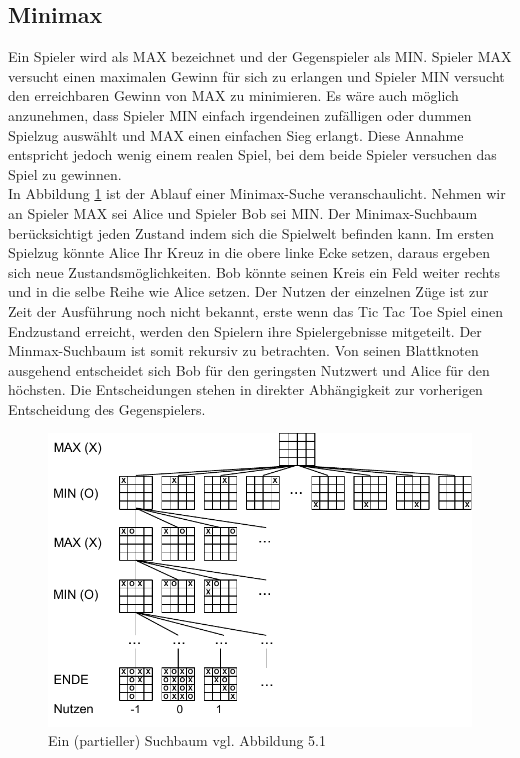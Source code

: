 \subsection{Minimax}
Ein Spieler wird als MAX bezeichnet und der Gegenspieler als MIN. Spieler MAX versucht einen maximalen Gewinn für sich zu erlangen und Spieler MIN versucht den erreichbaren Gewinn von MAX zu minimieren. Es wäre auch möglich anzunehmen, dass Spieler MIN einfach irgendeinen zufälligen oder dummen Spielzug auswählt und MAX einen einfachen Sieg erlangt. Diese Annahme entspricht jedoch wenig einem realen Spiel, bei dem beide Spieler versuchen das Spiel zu gewinnen.\\

In Abbildung \ref{fig:minimax_tictactoe} ist der Ablauf einer Minimax-Suche veranschaulicht. Nehmen wir an Spieler MAX sei Alice und Spieler Bob sei MIN. Der Minimax-Suchbaum berücksichtigt jeden Zustand indem sich die Spielwelt befinden kann. Im ersten Spielzug könnte Alice Ihr Kreuz in die obere linke Ecke setzen, daraus ergeben sich neue Zustandsmöglichkeiten. Bob könnte seinen Kreis ein Feld weiter rechts und in die selbe Reihe wie Alice setzen. Der Nutzen der einzelnen Züge ist zur Zeit der Ausführung noch nicht bekannt, erste wenn das Tic Tac Toe Spiel einen Endzustand erreicht, werden den Spielern ihre Spielergebnisse mitgeteilt. Der Minmax-Suchbaum ist somit rekursiv zu betrachten. Von seinen Blattknoten ausgehend entscheidet sich Bob für den geringsten Nutzwert und Alice für den höchsten. Die Entscheidungen stehen in direkter Abhängigkeit zur vorherigen Entscheidung des Gegenspielers. \\
  
\begin{figure}[!htbp]
  \centering
  \includegraphics{inhalt/abbildungen/minimax_tictactoe.pdf}
  \caption{Ein (partieller) Suchbaum vgl. Abbildung 5.1 \cite[208]{Russell}}
  \label{fig:minimax_tictactoe}
\end{figure} 


